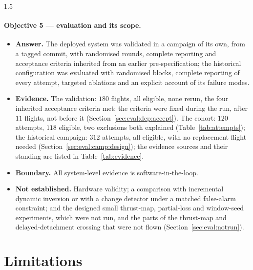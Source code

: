 \begin{spacing}{1.5}
\paragraph{Objective 5 --- evaluation and its scope.}
\begin{itemize}
\item \textbf{Answer.} The deployed system was validated in a campaign of its
own, from a tagged commit, with randomised rounds, complete reporting and
acceptance criteria inherited from an earlier pre-specification; the historical
configuration was evaluated with randomised blocks, complete reporting of every
attempt, targeted ablations and an explicit account of its failure modes.
\item \textbf{Evidence.} The validation: $180$ flights, all eligible, none
rerun, the four inherited acceptance criteria met; the criteria were fixed during
the run, after $11$ flights, not before it (Section~\ref{sec:eval:dep:accept}).
The cohort: $120$ attempts, $118$ eligible, two exclusions both
explained (Table~\ref{tab:attempts}); the historical campaign: $312$ attempts, all
eligible, with no replacement flight needed (Section~\ref{sec:eval:camp:design});
the evidence sources and their standing are listed in Table~\ref{tab:evidence}.
\item \textbf{Boundary.} All system-level evidence is software-in-the-loop.
\item \textbf{Not established.} Hardware validity; a comparison with
incremental dynamic inversion or with a change detector under a matched
false-alarm constraint; and the designed small thrust-map, partial-loss and
window-seed experiments, which were not run, and the parts of the thrust-map and
delayed-detachment crossing that were not flown (Section~\ref{sec:eval:notrun}).
\end{itemize}

\section{Limitations}


\end{spacing}

